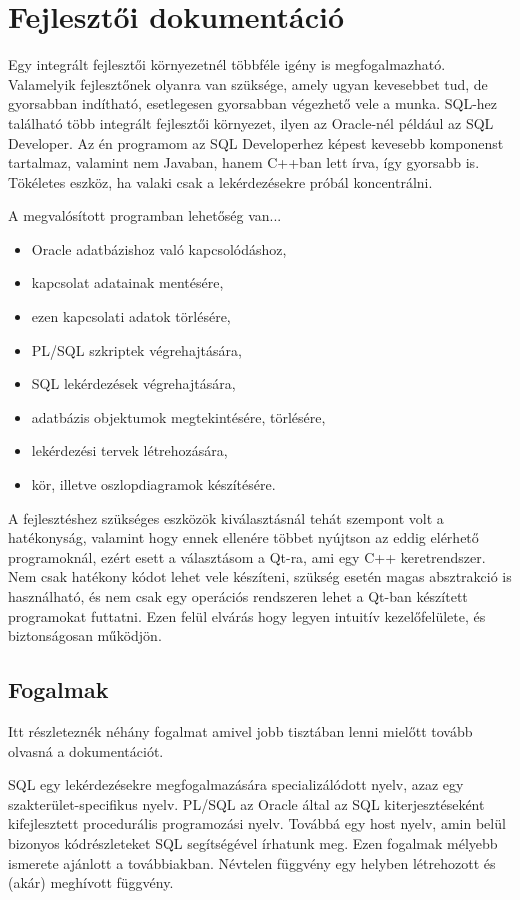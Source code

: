 \chapter{Fejlesztői dokumentáció}

Egy integrált fejlesztői környezetnél többféle igény is megfogalmazható. Valamelyik fejlesztőnek
olyanra van szüksége, amely ugyan kevesebbet tud, de gyorsabban indítható, esetlegesen gyorsabban
végezhető vele a munka. SQL-hez található több integrált fejlesztői környezet, ilyen az Oracle-nél
például az SQL Developer\cite{sqldeveloper}.
Az én programom az SQL Developerhez képest kevesebb komponenst tartalmaz, valamint nem Javaban, hanem C++ban lett írva,
így gyorsabb is. Tökéletes eszköz, ha valaki csak a lekérdezésekre próbál koncentrálni.

A megvalósított programban lehetőség van...
\begin{itemize}
  \item Oracle adatbázishoz való kapcsolódáshoz,
  \item kapcsolat adatainak mentésére,
  \item ezen kapcsolati adatok törlésére,
  \item PL/SQL szkriptek végrehajtására,
  \item SQL lekérdezések végrehajtására,
  \item adatbázis objektumok megtekintésére, törlésére,
  \item lekérdezési tervek létrehozására,
  \item kör, illetve oszlopdiagramok készítésére.
\end{itemize}

A fejlesztéshez szükséges eszközök kiválasztásnál tehát szempont volt a hatékonyság, valamint hogy
ennek ellenére többet nyújtson az eddig elérhető programoknál, ezért esett a választásom a Qt-ra, ami egy C++ keretrendszer.
Nem csak hatékony kódot lehet vele készíteni, szükség esetén magas absztrakció is használható, és nem
csak egy operációs rendszeren lehet a Qt-ban készített programokat futtatni. Ezen felül elvárás hogy legyen intuitív kezelőfelülete,
és biztonságosan működjön.

\section{Fogalmak}
Itt részleteznék néhány fogalmat amivel jobb tisztában lenni mielőtt tovább olvasná a dokumentációt.

SQL egy lekérdezésekre megfogalmazására specializálódott nyelv, azaz egy szakterület-specifikus nyelv.
PL/SQL az Oracle által az SQL kiterjesztéseként kifejlesztett procedurális programozási nyelv. Továbbá egy host nyelv,
amin belül bizonyos kódrészleteket SQL segítségével írhatunk meg. Ezen fogalmak mélyebb ismerete ajánlott a továbbiakban.
Névtelen függvény egy helyben létrehozott és (akár) meghívott függvény.

